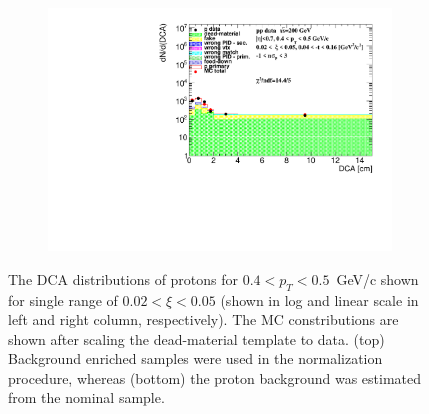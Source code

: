 \begin{figure}[h!]
\begin{subfigure}{.49\textwidth}
	\end{subfigure}
	\begin{subfigure}{.49\textwidth}
		\includegraphics[width=\linewidth, page=4]{chapters/chrgSTAR/img/DCAproton/background_p_0.pdf}
	\end{subfigure}
	\caption{The $\textrm{DCA}$ distributions of protons for $0.4<p_T<0.5$~GeV/c shown for single range of $0.02<\xi<0.05$ (shown in log and linear scale in left and right column, respectively). The MC  constributions are shown after scaling the dead-material template  to data. (top) Background enriched samples were used in the normalization procedure, whereas (bottom) the proton background was estimated from the nominal sample.}
	\label{fig:bkg_proton}
\end{figure}

